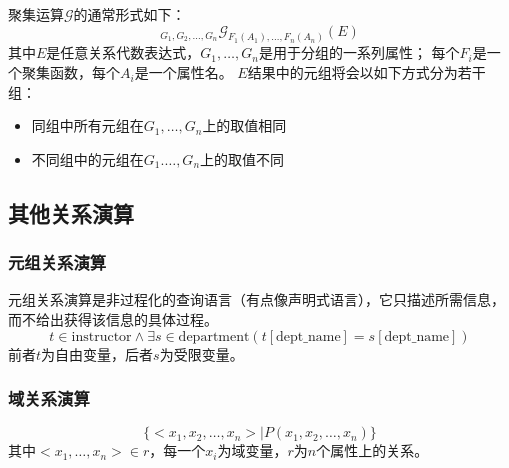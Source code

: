 \begin{definition}[聚集运算]
聚集运算$\mathcal{G}$的通常形式如下：
\[{}_{G_1,G_2,\ldots,G_n}\mathcal{G}_{F_1(A_1),\ldots,F_n(A_n)}(E)\]
其中$E$是任意关系代数表达式，$G_1,\ldots,G_n$是用于分组的一系列属性；
每个$F_i$是一个聚集函数，每个$A_i$是一个属性名。
$E$结果中的元组将会以如下方式分为若干组：
\begin{itemize}
	\item 同组中所有元组在$G_1,\ldots,G_n$上的取值相同
	\item 不同组中的元组在$G_1.\ldots,G_n$上的取值不同
\end{itemize}
\end{definition}

\subsection{其他关系演算}
\subsubsection{元组关系演算}
元组关系演算是非过程化的查询语言（有点像声明式语言），它只描述所需信息，而不给出获得该信息的具体过程。
\[t\in\text{instructor}\land\exists s\in\text{department}(t[\text{dept\_name}]=s[\text{dept\_name}])\]
前者$t$为自由变量，后者$s$为受限变量。

\subsubsection{域关系演算}
\[\{<x_1,x_2,\ldots,x_n>\mid P(x_1,x_2,\ldots,x_n)\}\]
其中$<x_1,\ldots,x_n>\in r$，每一个$x_i$为域变量，$r$为$n$个属性上的关系。